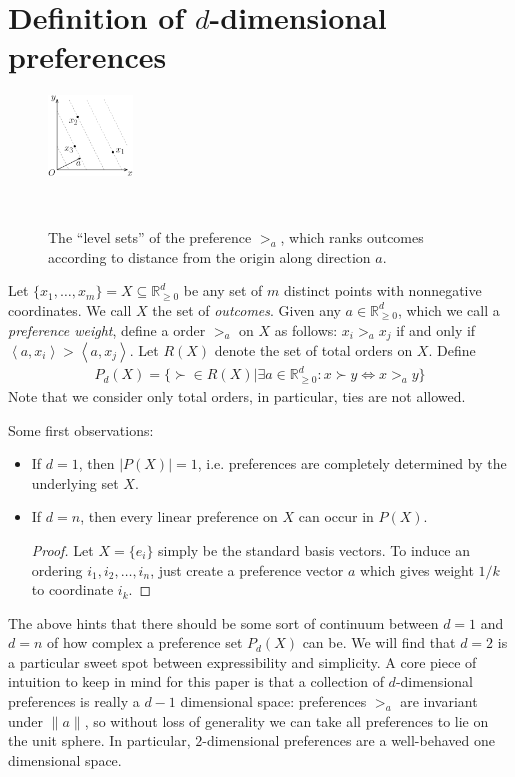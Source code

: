 \documentclass[12pt]{article}
\newcommand{\Rgz}{\mathbb{R}_{\ge 0}}
\newcommand{\ip}[2]{\left\langle{#1},{#2}\right\rangle}
\newcommand{\1}[1]{\mathds{1}[{#1}]}
\begin{document}
\section{Definition of $d$-dimensional preferences}
  \begin{figure}
    \vspace{-0.6in}
    \begin{center}
      \includegraphics[width=0.2\textwidth]{figures/def2DPref}
    \end{center}
    \ \caption{
      The ``level sets'' of the preference $>_a$,
      which ranks outcomes according to distance from the origin along
      direction $a$.
    }
  \end{figure}
  Let $\{x_1,\ldots,x_m\} = X\subseteq \Rgz^d$ be any set of
  $m$ distinct points with nonnegative coordinates.
  We call $X$ the set of \emph{outcomes}.
  Given any $a\in \Rgz^d$, which we call a \emph{preference weight},
  define a order $>_a$ on $X$ as follows:
  $x_i >_a x_j$ if and only if $\ip{a}{x_i} > \ip{a}{x_j}$.
  Let $R(X)$ denote the set of total orders on $X$.
  Define
  \begin{align*}
    P_d(X) = \{ \succ \in R(X) | \exists a\in\Rgz^d: x \succ y \iff x >_a y\}
  \end{align*}
  Note that we consider only total orders, in particular,
  ties are not allowed.

  Some first observations:
  \begin{itemize}
    \item If $d=1$, then $|P(X)| = 1$, i.e. preferences are completely
      determined by the underlying set $X$.
    \item If $d=n$, then every linear preference on $X$ can occur in $P(X)$.
      \begin{proof}
        Let $X = \{e_i\}$ simply be the standard basis vectors.
        To induce an ordering $i_1, i_2, \ldots, i_n$, just create a preference
        vector $a$ which gives weight $1/k$ to coordinate $i_k$.
      \end{proof}
  \end{itemize}
  The above hints that there should be some sort of continuum between $d=1$
  and $d=n$ of how complex a preference set $P_d(X)$ can be.
  We will find that $d=2$ is a particular sweet spot between expressibility and
  simplicity.
  A core piece of intuition to keep in mind for this paper is that
  a collection of $d$-dimensional preferences is really a $d-1$ dimensional space:
  preferences $>_a$ are invariant under $\|a\|$, so without loss of generality
  we can take all preferences to lie on the unit sphere.
  In particular, $2$-dimensional preferences are a well-behaved one dimensional
  space.
\end{document}
